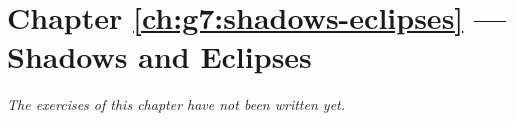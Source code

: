 \section*{Chapter \ref{ch:g7:shadows-eclipses} --- Shadows and Eclipses}


\emph{The exercises of this chapter have not been written yet.}
